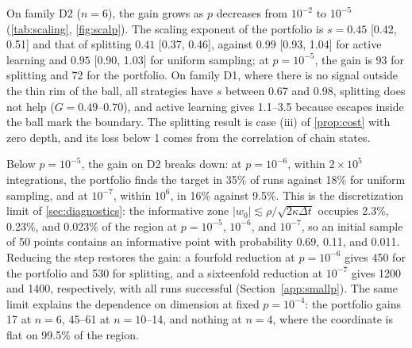 On family D2 ($n=6$), the gain grows as $p$ decreases from $10^{-2}$ to $10^{-5}$ (\cref{tab:scaling}, \cref{fig:scalp}). The scaling exponent of the portfolio is $s=0.45$ [0.42, 0.51] and that of splitting $0.41$ [0.37, 0.46], against $0.99$ [0.93, 1.04] for active learning and $0.95$ [0.90, 1.03] for uniform sampling; at $p=10^{-5}$, the gain is 93 for splitting and 72 for the portfolio. On family D1, where there is no signal outside the thin rim of the ball, all strategies have $s$ between 0.67 and 0.98, splitting does not help ($G=0.49$--$0.70$), and active learning gives 1.1--3.5 because escapes inside the ball mark the boundary. The splitting result is case (iii) of \cref{prop:cost} with zero depth, and its loss below 1 comes from the correlation of chain states.

Below $p=10^{-5}$, the gain on D2 breaks down: at $p=10^{-6}$, within $2\times10^5$ integrations, the portfolio finds the target in 35\% of runs against 18\% for uniform sampling, and at $10^{-7}$, within $10^6$, in 16\% against 9.5\%. This is the discretization limit of \cref{sec:diagnostics}: the informative zone $|w_0|\lesssim\rho/\sqrt{2\kappa\Delta t}$ occupies 2.3\%, 0.23\%, and 0.023\% of the region at $p=10^{-5}$, $10^{-6}$, and $10^{-7}$, so an initial sample of 50 points contains an informative point with probability 0.69, 0.11, and 0.011. Reducing the step restores the gain: a fourfold reduction at $p=10^{-6}$ gives 450 for the portfolio and 530 for splitting, and a sixteenfold reduction at $10^{-7}$ gives 1200 and 1400, respectively, with all runs successful (Section~\ref{app:smallp}). The same limit explains the dependence on dimension at fixed $p=10^{-4}$: the portfolio gains 17 at $n=6$, 45--61 at $n=10$--14, and nothing at $n=4$, where the coordinate is flat on 99.5\% of the region.

